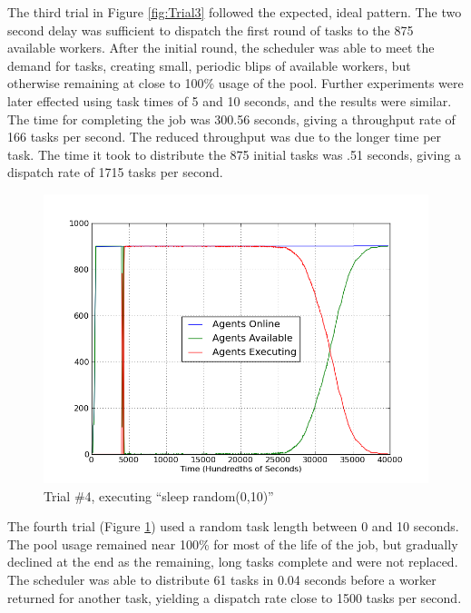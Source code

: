 The third trial in Figure \ref{fig:Trial3} followed the expected,
ideal pattern. The two second delay was sufficient to dispatch the
first round of tasks to the 875 available workers. After the initial
round, the scheduler was able to meet the demand for tasks, creating
small, periodic blips of available workers, but otherwise remaining
at close to 100\% usage of the pool. Further experiments were later
effected using task times of 5 and 10 seconds, and the results were
similar. The time for completing the job was 300.56 seconds, giving
a throughput rate of 166 tasks per second. The reduced throughput
was due to the longer time per task. The time it took to distribute
the 875 initial tasks was .51 seconds, giving a dispatch rate of 1715
tasks per second.

\begin{figure}
\includegraphics[width=\columnwidth]{figures/sleeprandom}
\caption{\label{fig:Trial4}Trial \#4, executing ``sleep random(0,10)''}
\end{figure}


The fourth trial (Figure \ref{fig:Trial4}) used a random task length
between 0 and 10 seconds. The pool usage remained near 100\% for most
of the life of the job, but gradually declined at the end as the remaining,
long tasks complete and were not replaced. The scheduler was able
to distribute 61 tasks in 0.04 seconds before a worker returned for
another task, yielding a dispatch rate close to 1500 tasks per second.

